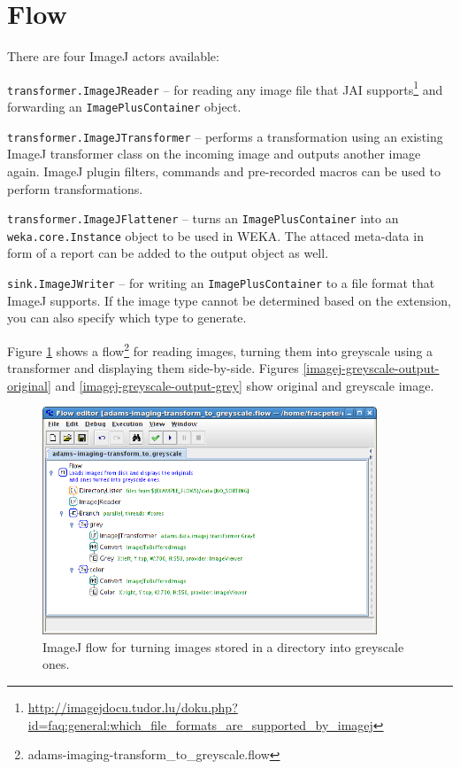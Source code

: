 \documentclass[a4paper]{book}
\begin{document}
\section{Flow}
There are four ImageJ actors available:
\begin{tight_itemize}
	\item \texttt{transformer.ImageJReader} -- for reading any image file that
	JAI supports\footnote{\url{http://imagejdocu.tudor.lu/doku.php?id=faq:general:which_file_formats_are_supported_by_imagej}{}}
	and forwarding an \texttt{ImagePlusContainer} object.
	\item \texttt{transformer.ImageJTransformer} -- performs a transformation
	using an existing ImageJ transformer class on the incoming image and
	outputs another image again. ImageJ plugin filters, commands and pre-recorded
	macros can be used to perform transformations.
	\item \texttt{transformer.ImageJFlattener} -- turns an
	\texttt{ImagePlusContainer} into an \texttt{weka.core.Instance} object to
	be used in WEKA. The attaced meta-data in form of a report can be added to the
	output object as well.
	\item \texttt{sink.ImageJWriter} -- for writing an \texttt{ImagePlusContainer}
	to a file format that ImageJ supports. If the image type cannot be
	determined based on the extension, you can also specify which type to generate.
\end{tight_itemize}

Figure \ref{imagej-greyscale-flow} shows a
flow\footnote{adams-imaging-transform\_to\_greyscale.flow} for reading images,
turning them into greyscale using a  transformer and displaying them
side-by-side.
Figures \ref{imagej-greyscale-output-original} and
\ref{imagej-greyscale-output-grey} show original and greyscale image.

\begin{figure}[htb]
  \centering
  \includegraphics[width=10.0cm]{images/imagej-greyscale-flow.png}
  \caption{ImageJ flow for turning images stored in a directory into greyscale
  ones.}
  \label{imagej-greyscale-flow}
\end{figure}
\end{document}
